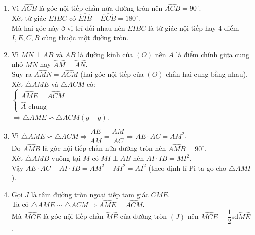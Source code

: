 \begin{ex}
{\begin{center}
	\end{center}
	\begin{enumerate}
		\item Vì $\widehat{ACB}$ là góc nội tiếp chắn nửa đường tròn nên $\widehat{ACB}=90^\circ$.\\
		Xét tứ giác $EIBC$ có $\widehat{EIB}+\widehat{ECB}=180^\circ$.\\
		Mà hai góc này ở vị trí đối nhau nên $EIBC$ là tứ giác nội tiếp hay $4$ điểm $I,E,C,B$ cùng thuộc một đường tròn.
		\item Vì $MN\perp AB$ và $AB$ là đường kính của $(O)$ nên $A$ là điểm chính giữa cung nhỏ $MN$ hay $\wideparen{AM}=\wideparen{AN}$.\\
		Suy ra $\widehat{AMN}=\widehat{ACM}$ (hai góc nội tiếp của $(O)$ chắn hai cung bằng nhau).\\
		Xét $\triangle AME$ và $\triangle ACM$ có:\\
		$\begin{cases}
		\widehat{AME}=\widehat{ACM}\\ \widehat{A}\text{ chung}
		\end{cases}$\\
		$\Rightarrow \triangle AME\backsim\triangle ACM (g-g)$.
		\item Vì $\triangle AME\backsim\triangle ACM\Rightarrow \dfrac{AE}{AM}=\dfrac{AM}{AC}\Rightarrow AE\cdot AC=AM^2$.\\
		Do $\widehat{AMB}$ là góc nội tiếp chắn nửa đường tròn nên $\widehat{AMB}=90^\circ$.\\
		Xét $\triangle AMB$ vuông tại $M$ có $MI\perp AB$ nên $AI\cdot IB=MI^2$.\\
		Vậy $AE\cdot AC-AI\cdot IB=AM^2-MI^2=AI^2$ (theo định lí Pi-ta-go cho $\triangle AMI$).
		\item Gọi $J$ là tâm đường tròn ngoại tiếp tam giác $CME$.\\
		Ta có $\triangle AME\backsim\triangle ACM\Rightarrow \widehat{AME}=\widehat{ACM}$.\\
		Mà $\widehat{MCE}$ là góc nội tiếp chắn $\wideparen{ME}$ của đường tròn $(J)$ nên $\widehat{MCE}=\dfrac{1}{2}$sđ$\wideparen{ME}$.\\

\end{enumerate}}
\end{ex}
